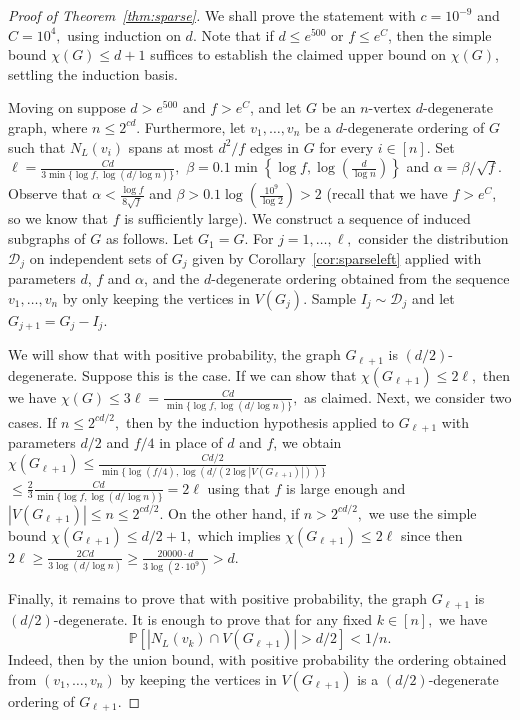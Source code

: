 \documentclass[10pt]{amsart}
\theoremstyle{definition}
\newcommand{\calD}{\mathcal{D}}
\renewcommand{\Pr}{\mathbb{P}}
\begin{document}
\begin{proof}[Proof of Theorem~\ref{thm:sparse}]
    We shall prove the statement with $c = 10^{-9}$ and $C = 10^4,$ using induction on $d$. Note that if $d \le e^{500}$ or $f\le e^{C}$, then the simple bound $\chi(G) \le d+1$ suffices to establish the claimed upper bound on $\chi(G)$, settling the induction basis.
    
    Moving on suppose $d> e^{500}$ and $f>e^{C}$, and let $G$ be an $n$-vertex $d$-degenerate graph, where $n \le 2^{cd}.$ Furthermore, let $v_1, \dots, v_n$ be a $d$-degenerate ordering of $G$ such that $N_L(v_i)$ spans at most $d^2/f$ edges in $G$ for every $i\in [n]$. Set $\ell = \frac{Cd}{3 \min\{\log f,\log(d/\log n)\}},$  $\beta = 0.1 \min\left\{\log f,\log\left(\frac{d}{\log n}\right)\right\}$ and $\alpha = \beta / \sqrt{f}.$ Observe that $\alpha < \frac{\log f}{8 \sqrt{f}}$ and $\beta>0.1\log\left(\frac{10^9}{\log 2}\right)>2$ (recall that we have $f>e^C$, so we know that $f$ is sufficiently large).
    We construct a sequence of induced subgraphs of $G$ as follows. Let $G_1 = G$. For $j = 1, \dots, \ell,$ consider the distribution $\calD_j$ on independent sets of $G_j$ given by Corollary~\ref{cor:sparseleft} applied with parameters $d$, $f$ and $\alpha$, and the $d$-degenerate ordering obtained from the sequence $v_1, \dots, v_n$ by only keeping the vertices in $V(G_j)$. Sample $I_j \sim \calD_j$ and let $G_{j+1} = G_j - I_j$.

    We will show that with positive probability, the graph $G_{\ell+1}$ is $(d/2)$-degenerate. Suppose this is the case. If we can show that $\chi(G_{\ell+1}) \le 2\ell,$ then we have $\chi(G) \le 3\ell = \frac{Cd}{\min\{\log f,\log (d / \log n)\}},$ as claimed. Next, we consider two cases. If $n \le 2^{cd/2},$ then by the induction hypothesis applied to $G_{\ell+1}$ with parameters $d/2$ and $f/4$ in place of $d$ and $f$, we obtain $\chi(G_{\ell+1}) \le \frac{C d / 2}{\min\{\log(f/4),\log (d / (2\log|V(G_{\ell+1})|))\}}$ $ \le \frac{2}{3} \frac{C d}{\min\{\log f, \log (d / \log n)\}} = 2\ell$ using that $f$ is large enough and $|V(G_{\ell+1})| \le n \le 2^{c d/2}$.
    On the other hand, if $n > 2^{cd / 2},$ we use the  simple bound $\chi(G_{\ell+1}) \le d/2 + 1,$ which implies $\chi(G_{\ell+1})\le 2\ell$ since then $2\ell \ge \frac{2 C d}{3\log (d / \log n)} \ge \frac{20000\cdot d}{3\log (2 \cdot 10^9)} > d.$

    Finally, it remains to prove that with positive probability, the graph $G_{\ell+1}$ is $(d/2)$-degenerate. It is enough to prove that for any fixed $k \in [n],$ we have
    \[ \Pr[ |N_L(v_k) \cap V(G_{\ell+1})| > d/2 ] < 1 / n. \]
    Indeed, then by the union bound, with positive probability the ordering obtained from $(v_1, \dots, v_n)$ by keeping the vertices in $V(G_{\ell+1})$ is a $(d/2)$-degenerate ordering of $G_{\ell+1}$. 


\end{proof}
\end{document}
